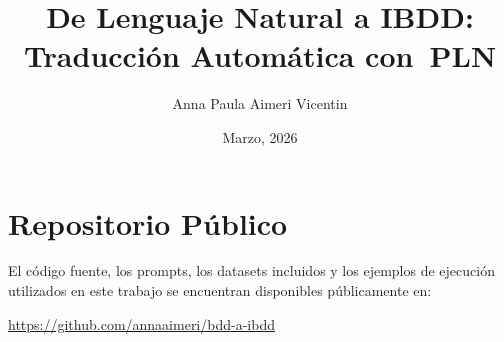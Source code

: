 \documentclass[a4paper,12pt]{report}
\title{De Lenguaje Natural a IBDD:\\[0.2cm] Traducción Automática con~PLN}
\author{Anna Paula Aimeri Vicentin}
\date{Marzo, 2026}
\begin{document}
\hypersetup{pageanchor=false}
\maketitle
\clearpage
\hypersetup{pageanchor=true}






\chapter*{Repositorio Público}

El código fuente, los prompts, los datasets incluidos y los ejemplos de ejecución utilizados en este trabajo se encuentran disponibles públicamente en:

\begin{center}
\url{https://github.com/annaaimeri/bdd-a-ibdd}
\end{center}

\clearpage

\tableofcontents

\clearpage







\appendix
\setcounter{tocdepth}{0}

\setcounter{tocdepth}{2}

\printbibliography
\end{document}
